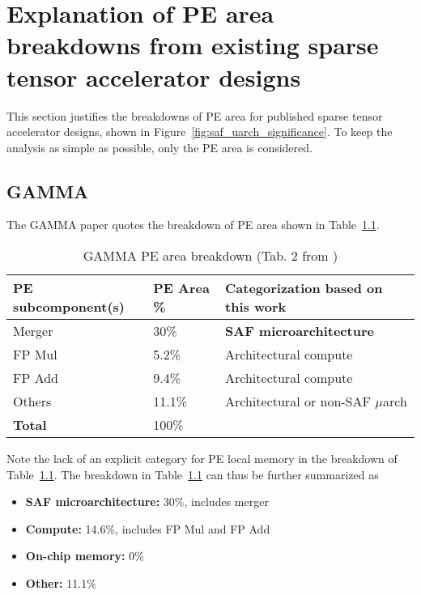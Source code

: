 \chapter{Explanation of PE area breakdowns from existing sparse tensor accelerator designs}
\label{appendix:pe_breakdowns}

This section justifies the breakdowns of PE area for published sparse tensor accelerator designs, shown in Figure~\ref{fig:saf_uarch_significance}. To keep the analysis as simple as possible, only the PE area is considered.

\section{GAMMA\cite{gamma}}
\label{appendix:pe_breakdowns_gamma}

The GAMMA\cite{gamma} paper quotes the breakdown of PE area shown in Table~\ref{tab:gamma_pe_breakdown}.

\begin{table}
\caption{GAMMA PE area breakdown (Tab. 2 from \cite{gamma})}
\label{tab:gamma_pe_breakdown}
\begin{center}
\begin{tabular}{||l|l|l||}\hline
\textbf{PE subcomponent(s)} & \textbf{PE Area} \%  & \textbf{Categorization based on this work}  \\\hline
Merger	   & 30\% & \textbf{SAF microarchitecture} \\\hline
FP Mul	   & 5.2\% & Architectural compute \\\hline
FP Add	   & 9.4\% & Architectural compute \\\hline
Others	   & 11.1\% & Architectural or non-SAF $\mu$arch \\\hline
\textbf{Total}	   & 100\% & \\\hline
\end{tabular}
\end{center}
\end{table}

Note the lack of an explicit category for PE local memory in the breakdown of Table~\ref{tab:gamma_pe_breakdown}. The breakdown in Table~\ref{tab:gamma_pe_breakdown} can thus be further summarized as

\begin{itemize}
    \item \textbf{SAF microarchitecture:} 30\%, includes merger
    \item \textbf{Compute:} 14.6\%, includes FP Mul and FP Add
    \item \textbf{On-chip memory:} 0\%
    \item \textbf{Other:} 11.1\%
\end{itemize}

